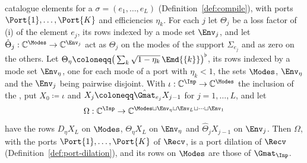 \begin{lemma}
\begin{enumerate}[label=(\roman*),leftmargin=2.2em]
  catalogue elements for a 
  $\sigma=(e_1,\dots,e_L)$ (Definition~\ref{def:compile}), with ports
  $\Port{1},\dots,\Port{K}$ and efficiencies $\eta_k$. For each $j$ let
  $\Theta_j$ be a loss factor of (i) of the element $e_j$, its rows indexed
  by a mode set $\Env_j$, and let
  $\hat\Theta_j:\mathbb{C}^{\Modes}\to\mathbb{C}^{\Env_j}$ act as $\Theta_j$
  on the modes of the support $\Sigma_{e_j}$ and as zero on the others. Let
  $\Theta_\eta\coloneqq\big(\sum_{k}\sqrt{1-\eta_k}\,\Emd{\{k\}}\big)^{\flat}$,
  its rows indexed by a mode set $\Env_\eta$, one for each mode of a port
  with $\eta_k<1$, the sets $\Modes$, $\Env_\eta$ and the $\Env_j$ being
  pairwise disjoint. With $\iota:\mathbb{C}^{\Inp}\to\mathbb{C}^{\Modes}$ the
  inclusion of the , put $X_0\coloneqq\iota$ and
  $X_j\coloneqq\hat\Gmat_{e_j}X_{j-1}$ for $j=1,\dots,L$, and let
  \begin{equation}\label{eq:graph-dilation}
    \Omega:\mathbb{C}^{\Inp}\to\mathbb{C}^{\Modes\sqcup\Env_\eta\sqcup\Env_L\sqcup\dots\sqcup\Env_1}
  \end{equation}
  have the rows $D_\eta X_L$ on $\Modes$, $\Theta_\eta X_L$ on $\Env_\eta$
  and $\hat\Theta_jX_{j-1}$ on $\Env_j$. Then $\Omega$, with the ports
  $\Port{1},\dots,\Port{K}$ of $\Recv$, is a port dilation of $\Recv$
  (Definition~\ref{def:port-dilation}), and its rows on $\Modes$ are those of
  $\Gmat_{\Inp}$.
\end{enumerate}
\end{lemma}

